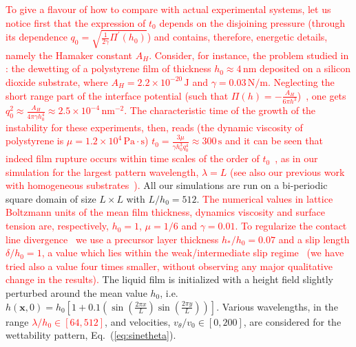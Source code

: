 \documentclass[twocolumn,amsmath,amssymb,showpacs,prl,superscriptaddress]{revtex4-1} %
\begin{document}
\textcolor{red}{To give a flavour of how to compare with actual experimental systems, let us notice
first that the expression of $t_0$ depends on the disjoining pressure (through its dependence 
 $q_0 = \sqrt{\frac{1}{2\gamma} \Pi^{\prime}(h_0)}$) and contains, therefore, energetic details, namely 
 the Hamaker constant $A_H$. Consider, for instance, the problem studied in \cite{becker2003complex}: the dewetting of a polystyrene film of thickness $h_0 \approx 4 \, \text{nm}$ deposited on a silicon 
dioxide substrate, where $A_H  = 2.2 \times 10^{-20} \, \text{J}$ and 
$\gamma = 0.03 \, \text{N}/\text{m}$. Neglecting the short range part of the interface potential
(such that $\Pi(h)= - \frac{A_H}{6\pi h^3}$)~\cite{Mecke_2005,becker2003complex}, one gets 
$q_0^2 \approx \frac{A_H}{4\pi \gamma h_0^4} \approx 2.5 \times 10^{-4} \, \text{nm}^{-2}$.
The characteristic time of the growth of the instability for these experiments, then, reads \cite{PhysRevLett.99.114503} (the dynamic viscosity of polystyrene is 
$\mu = 1.2 \times 10^4 \, \text{Pa} \cdot \text{s}$) $t_0 = \frac{3\mu}{\gamma h_0^3 q_0^4} \approx 300 \, \text{s}$ and it can be seen that indeed film rupture occurs within time 
scales of the order of $t_0$~\cite{becker2003complex}, as in our 
simulation for the largest pattern wavelength, $\lambda = L$ (see also our previous work
with homogeneous substrates~\cite{PhysRevE.104.034801}).}
All our simulations are run on a bi-periodic square domain of size $L \times L$ with 
$L/h_0 = 512 $. \textcolor{red}{The numerical values in lattice Boltzmann units of the 
mean film thickness, dynamics viscosity and surface tension are, respectively, $h_0=1$, $\mu=1/6$
and $\gamma=0.01$.}
\textcolor{red}{To regularize the contact line divergence~\cite{huh1971hydrodynamic} we use a precursor layer thickness $h_{\ast}/h_0=0.07$ and a slip length $\delta/h_0 = 1$, 
a value which lies
within the weak/intermediate slip regime~\cite{peschka2019signatures,fetzer2007quantifying, munch2005lubrication} (we have tried also a value four times smaller, without observing 
any major qualitative change in the results).} 
The liquid film is initialized with a height field slightly perturbed around the mean value $h_0$, i.e. $h(\mathbf{x},0) = h_0 \left[1 + 0.1 \left(\sin\left(\frac{2\pi x}{L}\right)\sin\left(\frac{2\pi y}{L}\right)\right)\right]$.
Various wavelengths, in the range \textcolor{red}{$\lambda/h_0 \in [64, 512]$}, and velocities,
$v_{\theta}/v_0 \in [0, 200]$, are considered for the wettability pattern, Eq.~(\ref{eq:sinetheta}). 
\end{document}
